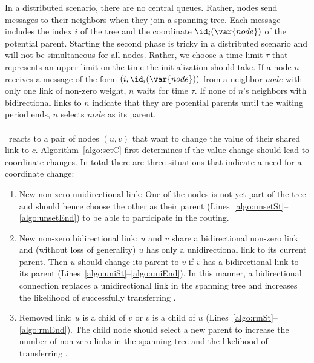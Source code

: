In a distributed scenario, there are no central queues. Rather, nodes send messages to their neighbors when they join a spanning tree. Each message includes the index $i$ of the tree and the coordinate $\id_i(\var{node})$ of the potential parent.
Starting the second phase is tricky in a distributed scenario and will not be simultaneous for all nodes. Rather, we choose a time limit $\tau$ that represents an upper limit on the time the initialization should take. If a node $n$ receives a message of the form  $(i,\id_i(\var{node}))$ from a neighbor $node$ with only one link of non-zero weight, $n$ waits for time $\tau$. If none of $n$'s neighbors with bidirectional links to $n$ indicate that they are potential parents until the waiting period ends, $n$ selects $node$ as its parent. 

\paragraph*{\setC}

\setC\ reacts to a pair of nodes $(u,v)$ that want to change the value of their shared link to $c$. 
Algorithm~\ref{algo:setC} first determines if the value change should lead to coordinate changes.
In total there are three situations that indicate a need for a coordinate change:
\begin{enumerate}
\item New non-zero unidirectional link: One of the nodes is not yet part of the tree and should hence choose the other as their parent (Lines~\ref{algo:unsetSt}--\ref{algo:unsetEnd}) to be able to participate in the routing.
\item New non-zero bidirectional link: $u$ and $v$ share a bidirectional non-zero link and (without loss of generality) $u$ has only a unidirectional link to its current parent. Then $u$ should change its parent to $v$ if $v$ has a bidirectional link to its parent (Lines~\ref{algo:uniSt}--\ref{algo:uniEnd}). In this manner, a bidirectional connection replaces a unidirectional link in the spanning tree and increases the likelihood of successfully transferring \money. 
\item Removed link: $u$ is a child of $v$ or $v$ is a child of $u$ (Lines~\ref{algo:rmSt}--\ref{algo:rmEnd}). The child node should select a new parent to increase the number of non-zero links in the spanning tree and the likelihood of transferring \money. 
\end{enumerate}

